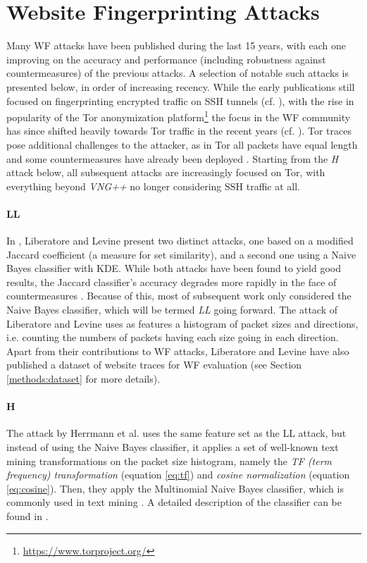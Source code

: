 \documentclass[
	ruledheaders=chapter,
	class=report,
	thesis={type=master, department=inf},
	accentcolor=1c,
	custommargins=true,
	marginpar=false,
	parskip=half-,
	fontsize=11pt,
]{tudapub}
\begin{document}
	\section{Website Fingerprinting Attacks}
	\label{prior:attacks}
	
	Many WF attacks have been published during the last 15 years, with each one improving on the accuracy and performance (including robustness against countermeasures) of the previous attacks. A selection of notable such attacks is presented below, in order of increasing recency. While the early publications still focused on fingerprinting encrypted traffic on SSH tunnels (cf. \cite{Liberatore2006,Herrmann2009,Panchenko2011,Dyer2012}), with the rise in popularity of the Tor anonymization platform\footnote{\url{https://www.torproject.org/}} the focus in the WF community has since shifted heavily towards Tor traffic in the recent years (cf. \cite{Dyer2012,Wang2014,Panchenko2016,Hayes2016,Sirinam2018,Wang2021}). Tor traces pose additional challenges to the attacker, as in Tor all packets have equal length and some countermeasures have already been deployed \cite{Perry2011}. Starting from the \textit{H} attack below, all subsequent attacks are increasingly focused on Tor, with everything beyond \textit{VNG++} no longer considering SSH traffic at all.
	
	\paragraph{LL} In \cite{Liberatore2006}, Liberatore and Levine present two distinct attacks, one based on a modified Jaccard coefficient (a measure for set similarity), and a second one using a Naive Bayes classifier with KDE. While both attacks have been found to yield good results, the Jaccard classifier's accuracy degrades more rapidly in the face of countermeasures \cite{Liberatore2006}. Because of this, most of subsequent work only considered the Naive Bayes classifier, which will be termed \textit{LL} going forward. The attack of Liberatore and Levine uses as features a histogram of packet sizes and directions, i.e. counting the numbers of packets having each size going in each direction. Apart from their contributions to WF attacks, Liberatore and Levine have also published a dataset of website traces for WF evaluation (see Section \ref{methods:dataset} for more details).
	
	\paragraph{H} The attack by Herrmann et al. \cite{Herrmann2009} uses the same feature set as the LL attack, but instead of using the Naive Bayes classifier, it applies a set of well-known text mining transformations on the packet size histogram, namely the \textit{TF (term frequency) transformation} (equation \ref{eq:tf}) and \textit{cosine normalization} (equation \ref{eq:cosine}). Then, they apply the Multinomial Naive Bayes classifier, which is commonly used in text mining \cite{Herrmann2009}. A detailed description of the classifier can be found in \cite[ch. 13]{Manning2008}.
	
\end{document}
